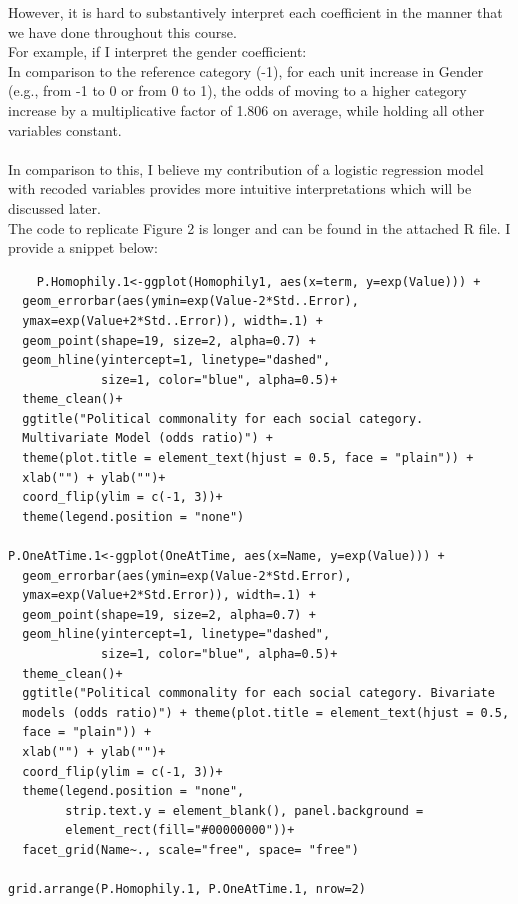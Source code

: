 \documentclass{article}
\begin{document}
However, it is hard to substantively interpret each coefficient in the manner that we have done throughout this course.
\\
For example, if I interpret the gender coefficient:
\\
In comparison to the reference category (-1), for each unit increase in Gender (e.g., from -1 to 0 or from 0 to 1), the odds of moving to a higher category increase by a multiplicative factor of 1.806 on average, while holding all other variables constant.
\\
\\
In comparison to this, I believe my contribution of a logistic regression model with recoded variables provides more intuitive interpretations which will be discussed later.
\\
The code to replicate Figure 2 is longer and can be found in the attached R file. I provide a snippet below: 
\begin{verbatim}
    P.Homophily.1<-ggplot(Homophily1, aes(x=term, y=exp(Value))) + 
  geom_errorbar(aes(ymin=exp(Value-2*Std..Error), 
  ymax=exp(Value+2*Std..Error)), width=.1) +
  geom_point(shape=19, size=2, alpha=0.7) +
  geom_hline(yintercept=1, linetype="dashed", 
             size=1, color="blue", alpha=0.5)+
  theme_clean()+ 
  ggtitle("Political commonality for each social category. 
  Multivariate Model (odds ratio)") +
  theme(plot.title = element_text(hjust = 0.5, face = "plain")) +
  xlab("") + ylab("")+
  coord_flip(ylim = c(-1, 3))+
  theme(legend.position = "none")

P.OneAtTime.1<-ggplot(OneAtTime, aes(x=Name, y=exp(Value))) + 
  geom_errorbar(aes(ymin=exp(Value-2*Std.Error), 
  ymax=exp(Value+2*Std.Error)), width=.1) +
  geom_point(shape=19, size=2, alpha=0.7) +
  geom_hline(yintercept=1, linetype="dashed", 
             size=1, color="blue", alpha=0.5)+
  theme_clean()+ 
  ggtitle("Political commonality for each social category. Bivariate
  models (odds ratio)") + theme(plot.title = element_text(hjust = 0.5, 
  face = "plain")) +
  xlab("") + ylab("")+
  coord_flip(ylim = c(-1, 3))+
  theme(legend.position = "none",
        strip.text.y = element_blank(), panel.background = 
        element_rect(fill="#00000000"))+
  facet_grid(Name~., scale="free", space= "free")

grid.arrange(P.Homophily.1, P.OneAtTime.1, nrow=2)

\end{verbatim}
\end{document}
